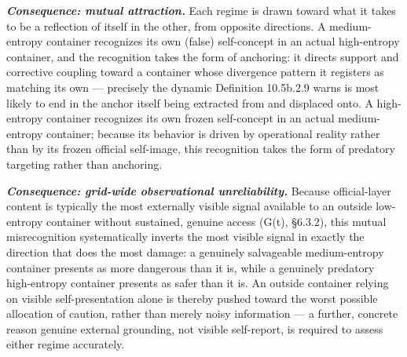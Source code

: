 \documentclass[
]{article}
\begin{document}
\emph{\textbf{Consequence: mutual attraction.}} Each regime is drawn
toward what it takes to be a reflection of itself in the other, from
opposite directions. A medium-entropy container recognizes its own
(false) self-concept in an actual high-entropy container, and the
recognition takes the form of anchoring: it directs support and
corrective coupling toward a container whose divergence pattern it
registers as matching its own --- precisely the dynamic Definition
10.5b.2.9 warns is most likely to end in the anchor itself being
extracted from and displaced onto. A high-entropy container recognizes
its own frozen self-concept in an actual medium-entropy container;
because its behavior is driven by operational reality rather than by its
frozen official self-image, this recognition takes the form of predatory
targeting rather than anchoring.

\emph{\textbf{Consequence: grid-wide observational unreliability.}}
Because official-layer content is typically the most externally visible
signal available to an outside low-entropy container without sustained,
genuine access (G(t), §6.3.2), this mutual misrecognition systematically
inverts the most visible signal in exactly the direction that does the
most damage: a genuinely salvageable medium-entropy container presents
as more dangerous than it is, while a genuinely predatory high-entropy
container presents as safer than it is. An outside container relying on
visible self-presentation alone is thereby pushed toward the worst
possible allocation of caution, rather than merely noisy information ---
a further, concrete reason genuine external grounding, not visible
self-report, is required to assess either regime accurately.
\end{document}
